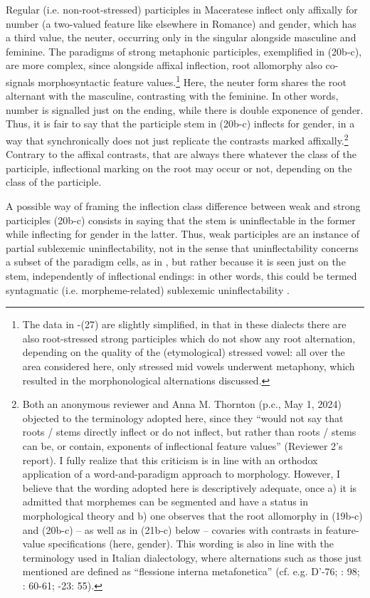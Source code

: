 \documentclass[output=paper]{langscibook}
\begin{document}
Regular (i.e. non-root-stressed) participles in Maceratese inflect only affixally  for number (a two-valued feature like elsewhere in Romance) and gender, which has a third value, the neuter, occurring only in the singular alongside masculine and feminine. The paradigms of strong metaphonic participles, exemplified in (20b-c), are more complex, since alongside affixal inflection, root allomorphy also co-signals morphosyntactic feature values.\footnote{The data in -(27) are slightly simplified, in that in these dialects there are also root-stressed strong participles which do not show any root alternation, depending on the quality of the (etymological) stressed vowel: all over the area considered here, only stressed mid vowels underwent metaphony, which resulted in the morphonological alternations discussed.} Here, the neuter form shares the root alternant with the masculine, contrasting with the feminine. In other words, number is signalled just on the ending, while there is double exponence of gender. Thus, it is fair to say that the participle stem in (20b-c) inflects for gender, in a way that synchronically does not just replicate the contrasts marked affixally.\footnote{Both an anonymous reviewer and Anna M. Thornton (p.c., May 1, 2024) objected to the terminology adopted here, since they “would not say that roots / stems directly inflect or do not inflect, but rather than roots / stems can be, or contain, exponents of inflectional feature values” (Reviewer 2’s report). I fully realize that this criticism is in line with an orthodox application of a word-and-paradigm approach to morphology. However, I believe that the wording adopted here is descriptively adequate, once a) it is admitted that morphemes can be segmented and have a status in morphological theory and b) one observes that the root allomorphy in (19b-c) and (20b-c) – as well as in (21b-c) below – covaries with contrasts in feature-value specifications (here, gender). This wording is also in line with the terminology used in Italian dialectology, where alternations such as those just mentioned are defined as “flessione interna metafonetica” (cf. e.g. D’\citealt{Elia1975}-76; \citealt{PaciaroniEtAl2013}: 98; \citealt{Maturi2023}: 60-61; \citealt{Mileti2022}-23: 55).} Contrary to the affixal contrasts, that are always there whatever the class of the participle, inflectional marking on the root may occur or not, depending on the class of the participle.

A possible way of framing the inflection class difference between weak  and strong participles (20b-c) consists in saying that the stem is uninflectable in the former while inflecting for gender in the latter. Thus, weak participles are an instance of partial sublexemic uninflectability, not in the sense that uninflectability concerns a subset of the paradigm cells, as in , but rather because it is seen just on the stem, independently of inflectional endings: in other words, this could be termed syntagmatic (i.e. morpheme-related) sublexemic uninflectability .
\end{document}
